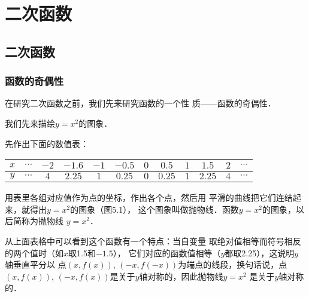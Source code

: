 \chapter{二次函数}

\section{二次函数}
\subsection{函数的奇偶性}

在研究二次函数之前，我们先来研究函数的一个性
质——函数的奇偶性．

我们先来描绘$y=x^2$的图象．

先作出下面的数值表：

\begin{center}
\begin{tabular}{c|ccccccccccc}
    \hline
    $x$   &$\cdots$&   $-2$   &   $-1.6$   &   $-1$   &   $-0.5$   &   $0$   &   $0.5$   &   $1$   &   $1.5$   &   $2$   &   $\cdots$      \\
    \hline
       $y$  &$\cdots$ &   $4$   &   $2.25$   &   $1$   &   $0.25$   &   $0$   &   $0.25$   &   $1$   &   $2.25$   &   $4$   &   $\cdots$\\
       \hline
\end{tabular}
\end{center}

用表里各组对应值作为点的坐标，作出各个点，然后用
平滑的曲线把它们连结起来，就得出$y=x^2$的图象（图5.1），
这个图象叫做抛物线．函数$y=x^2$的图象，以后简称为抛物线
$y=x^2$．

\begin{figure}[htp]
    \centering
{}
    \caption{}
\end{figure}


从上面表格中可以看到这个函数有一个特点：当自变量
取绝对值相等而符号相反的两个值时（如$x$取1.5和$-1.5$），
它们对应的函数值相等（$y$都取2.25），这说明$y$轴垂直平分以
点$(x,f(x))$, $(-x,f(-x))$为端点的线段，换句话说，点
$(x,f(x))$, $(-x,f(x))$是关于$y$轴对称的，因此抛物线$y=x^2$
是关于$y$轴对称的．

